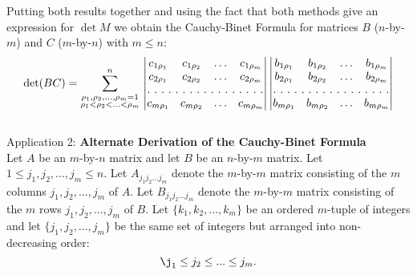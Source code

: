 Putting both results together and using the fact that both methods give an expression for $\det M$ we obtain the Cauchy-Binet Formula for matrices $B$ ($n$-by-$m$) and $C$ ($m$-by-$n$) with $m\le n$:
\begin{equation}
\det(BC) =\sum_{\substack{\rho_1, \rho_2, ...,\rho_m =1 \\ \rho_1 < \rho_2 < ... < \rho_m}}^n \,
\begin{vmatrix}
c_{1\rho_1} & c_{1\rho_2}  & \hdots & c_{1\rho_m}  \\
c_{2\rho_1} & c_{2\rho_2}  & \hdots & c_{2\rho_m}  \\
\hdotsfor[2]{4}\\
c_{m\rho_1} & c_{m\rho_2}  & \hdots & c_{m\rho_m}  \\
\end{vmatrix}
\begin{vmatrix}
b_{1\rho_1} & b_{1\rho_2}  & \hdots & b_{1\rho_m}  \\
b_{2\rho_1} & b_{2\rho_2}  & \hdots & b_{2\rho_m}  \\
\hdotsfor[2]{4}\\
b_{m\rho_1} & b_{m\rho_2}  & \hdots & b_{m\rho_m}  \\
\end{vmatrix}
\end{equation}\\
 
Application 2: {\bf Alternate Derivation of the Cauchy-Binet Formula}\\
 Let $A$ be an $m$-by-$n$ matrix and let $B$ be an $n$-by-$m$ matrix. Let $1\le j_1,j_2,...,j_m\le n$.
 Let $A_{j_1j_2...j_m}$ denote the $m$-by-$m$ matrix consisting of the $m$ columns $j_1,j_2,...,j_m$ of $A$.
 Let $B_{j_1j_2...j_m}$ denote the $m$-by-$m$ matrix consisting of the $m$ rows $j_1,j_2,...,j_m$ of $B$.
 Let $\{k_1,k_2,...,k_m\}$ be an ordered $m$-tuple of integers and let $\{j_1,j_2,...,j_m\}$ be the same set of integers but arranged into non-decreasing order:
 $$\j_1\le j_2 \le ... \le j_m.$$
 
